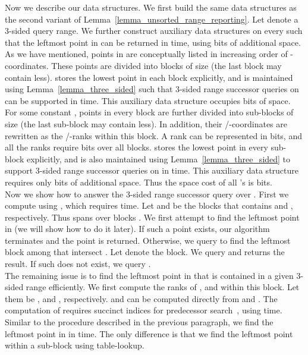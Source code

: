 \documentclass{llncs}
\begin{document}
\indent Now we describe our data structures.
We first build the same data structures as the second variant of Lemma~\ref{lemma_unsorted_range_reporting}.
Let  denote a 3-sided query range.
We further construct auxiliary data structures on every  such that
the leftmost point in  can be returned in  time, using  bits of additional space. \\
\indent As we have mentioned, points in  are conceptually listed in increasing order of -coordinates.
These points are divided into blocks  of size  (the last block may contain less).
 stores the lowest point in each block explicitly,
and is maintained using Lemma~\ref{lemma_three_sided} such that 3-sided range successor queries on  can be supported in  time.
This auxiliary data structure occupies  bits of space. \\
\indent For some constant , points in every block  are further divided into sub-blocks
 of size  (the last sub-block may contain less).
In addition, their /-coordinates are rewritten as the /-ranks within this block.
A rank can be represented in  bits, and all the ranks require  bits over all blocks.
 stores the lowest point in every sub-block explicitly,
and is also maintained using Lemma~\ref{lemma_three_sided} to support 3-sided range successor queries on  in  time.
This auxiliary data structure requires only 
bits of additional space.
Thus the space cost of all 's is  bits. \\
\indent Now we show how to answer the 3-sided range successor query  over .
First we compute  using , which requires  time.
Let  and  be the blocks that contains  and , respectively.
Thus  spans over blocks .
We first attempt to find the leftmost point in  (we will show how to do it later).
If such a point exists, our algorithm terminates and the point is returned.
Otherwise, we query  to find the leftmost block among  that intersect .
Let  denote the block.
We query  and returns the result.
If such  does not exist, we query . \\
\indent The remaining issue is to find the leftmost point in  that is contained in a given 3-sided range  efficiently.
We first compute the ranks of ,  and  within this block.
Let them be ,  and , respectively.
 and  can be computed directly from  and .
The computation of  requires succinct indices for predecessor search~\cite{DBLP:conf/stacs/GrossiORR09}, using  time.
Similar to the procedure described in the previous paragraph,
we find the leftmost point in  in  time.
The only difference is that we find the leftmost point within a sub-block using table-lookup.
\end{document}
